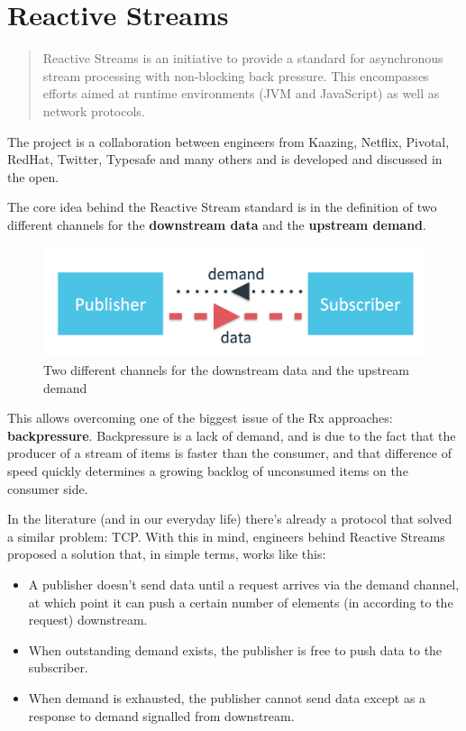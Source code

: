 \chapter{Reactive Streams}\label{reactive-streams}

\begin{quote}
Reactive Streams is an initiative to provide a standard for asynchronous
stream processing with non-blocking back pressure. This encompasses
efforts aimed at runtime environments (JVM and JavaScript) as well as
network protocols.
\end{quote}

The project is a collaboration between engineers from Kaazing, Netflix,
Pivotal, RedHat, Twitter, Typesafe and many others and is developed and
discussed in the open.

The core idea behind the Reactive Stream standard is in the definition
of two different channels for the \textbf{downstream data} and the
\textbf{upstream demand}.

\begin{figure}[htbp]
\centering
\includegraphics[scale=0.25]{imgs/stream.png}
\caption{Two different channels for the downstream data and the upstream
demand}
\end{figure}

This allows overcoming one of the biggest issue of the Rx approaches:
\textbf{backpressure}. Backpressure is a lack of demand, and is due to
the fact that the producer of a stream of items is faster than the
consumer, and that difference of speed quickly determines a growing
backlog of unconsumed items on the consumer side.

In the literature (and in our everyday life) there's already a protocol
that solved a similar problem: TCP. With this in mind, engineers behind
Reactive Streams proposed a solution that, in simple terms, works like
this:

\begin{itemize}
\itemsep1pt\parskip0pt
\item
  A publisher doesn't send data until a request arrives via the demand
  channel, at which point it can push a certain number of elements (in
  according to the request) downstream.
\item
  When outstanding demand exists, the publisher is free to push data to
  the subscriber.
\item
  When demand is exhausted, the publisher cannot send data except as a
  response to demand signalled from downstream.
\end{itemize}

